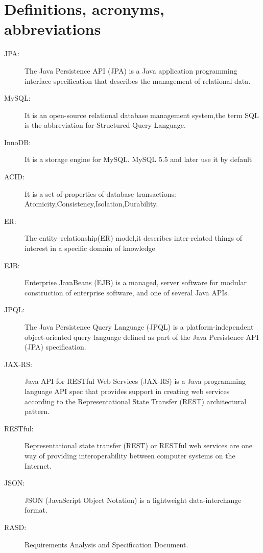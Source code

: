 \section{Definitions, acronyms, abbreviations}
\begin{description}
    \item[JPA:] The Java Persistence API (JPA) is a Java application programming interface specification that describes the management of relational data.
    \item[MySQL:]It is an open-source relational database management system,the term SQL is the abbreviation for Structured Query Language.
    \item[InnoDB:]It is a storage engine for MySQL. MySQL 5.5 and later use it by default
    \item[ACID:]It is a set of properties of database transactions: Atomicity,Consistency,Isolation,Durability.
    \item[ER:]The entity–relationship(ER) model,it describes inter-related things of interest in a specific domain of knowledge
    \item[EJB:]Enterprise JavaBeans (EJB) is a managed, server software for modular construction of enterprise software, and one of several Java APIs.
    \item[JPQL:]The Java Persistence Query Language (JPQL) is a platform-independent object-oriented query language defined as part of the Java Persistence API (JPA) specification.
    \item[JAX-RS:]Java API for RESTful Web Services (JAX-RS) is a Java programming language API spec that provides support in creating web services according to the Representational State Transfer (REST) architectural pattern.
    \item[RESTful:]Representational state transfer (REST) or RESTful web services are one way of providing interoperability between computer systems on the Internet.
    \item[JSON:]JSON (JavaScript Object Notation) is a lightweight data-interchange format.
    \item[RASD:] Requirements Analysis and Specification Document.
\end{description}
